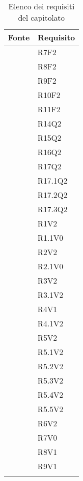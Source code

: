 		\begin{table}[H]
			\centering
			{\def\arraystretch{1.4}
			\begin{tabularx}{\textwidth}{YY}
				\textbf{Fonte} & \textbf{Requisito} \\
				\toprule
				 & R7F2 \\
				 & R8F2 \\
				 & R9F2 \\
				 & R10F2 \\ 
				 & R11F2 \\
				 & R14Q2 \\
				 & R15Q2 \\
				 & R16Q2 \\
				 & R17Q2 \\
				 & R17.1Q2 \\
				 & R17.2Q2 \\
				 & R17.3Q2 \\
				 & R1V2 \\
				 & R1.1V0 \\
				 & R2V2 \\
				 & R2.1V0 \\
				 & R3V2 \\
				 & R3.1V2 \\
				 & R4V1 \\
				 & R4.1V2 \\
				 & R5V2 \\
				 & R5.1V2 \\
				 & R5.2V2 \\
				 & R5.3V2 \\
				 & R5.4V2 \\
				 & R5.5V2 \\
				 & R6V2 \\
				 & R7V0 \\
				 & R8V1 \\
				  & R9V1 \\
				\bottomrule\\
			\end{tabularx}}
			\caption{Elenco dei requisiti del capitolato}
		\end{table}
	
